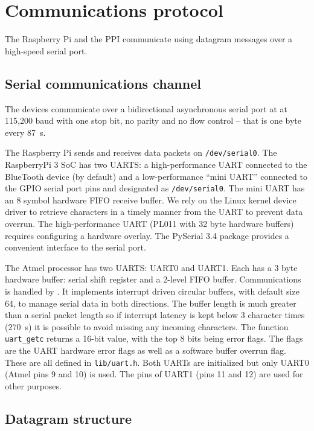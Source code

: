 \documentclass[11pt,fleqn]{article}
\begin{document}
\section{Communications protocol}\label{sec:comms}
The Raspberry Pi and the PPI communicate using datagram messages over a high-speed serial port.

\subsection{Serial communications channel}
The devices communicate over a bidirectional asynchronous serial port at  at 115,200 baud with one stop bit, no parity and no flow
control -- that is  one byte every 87\unit{\mu s}.

The Raspberry Pi sends and receives data packets on \texttt{/dev/serial0}.
The RaspberryPi 3 SoC has two UARTS: a high-performance UART connected to the BlueTooth device (by default) and a low-performance
``mini UART'' connected to the GPIO serial port pins and designated as \texttt{/dev/serial0}.
The mini UART has an 8 symbol hardware FIFO receive buffer. 
We rely on the Linux kernel device driver to retrieve characters in a timely manner from the UART to prevent 
data overrun.
The high-performance UART (PL011 with 32 byte hardware buffers) requires configuring a hardware overlay.
The PySerial 3.4 package provides a convenient interface to the serial port.

The Atmel processor has two UARTS: UART0 and UART1. Each has a 3 byte hardware buffer: serial shift register and a 2-level FIFO buffer.
Communications is handled by \cite{Fleury}.  It implements interrupt driven circular buffers, with default size 64, to manage serial data in both directions.  
The buffer length is much greater than a
serial packet length so if interrupt latency is kept below 3 character times (270\unit{\mu s}) it is possible to avoid missing any incoming characters.
The function \texttt{uart\_getc} returns a 16-bit value, with the top 8 bits being error flags.  The flags are the UART hardware error flags as well as
a software buffer overrun flag.  These are all defined in \texttt{lib/uart.h}.    
Both UARTs are initialized but only UART0 (Atmel pins 9 and 10) is used. The pins of UART1 (pins 11 and 12) are used for other purposes.


\subsection{Datagram structure}
\end{document}
